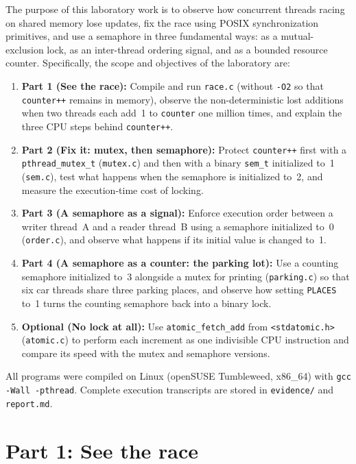 \documentclass{../latex/utmreport}
\providecommand{\tightlist}{\setlength{\itemsep}{0pt}\setlength{\parskip}{0pt}}
\begin{document}
The purpose of this laboratory work is to observe how concurrent threads racing on shared memory lose updates, fix the race using POSIX synchronization primitives, and use a semaphore in three fundamental ways: as a mutual-exclusion lock, as an inter-thread ordering signal, and as a bounded resource counter. Specifically, the scope and objectives of the laboratory are:
\begin{enumerate}
\tightlist
\item \textbf{Part 1 (See the race):} Compile and run \texttt{race.c} (without \texttt{-O2} so that \texttt{counter++} remains in memory), observe the non-deterministic lost additions when two threads each add~1 to \texttt{counter} one million times, and explain the three CPU steps behind \texttt{counter++}.
\item \textbf{Part 2 (Fix it: mutex, then semaphore):} Protect \texttt{counter++} first with a \texttt{pthread\_mutex\_t} (\texttt{mutex.c}) and then with a binary \texttt{sem\_t} initialized to~1 (\texttt{sem.c}), test what happens when the semaphore is initialized to~2, and measure the execution-time cost of locking.
\item \textbf{Part 3 (A semaphore as a signal):} Enforce execution order between a writer thread~A and a reader thread~B using a semaphore initialized to~0 (\texttt{order.c}), and observe what happens if its initial value is changed to~1.
\item \textbf{Part 4 (A semaphore as a counter: the parking lot):} Use a counting semaphore initialized to~3 alongside a mutex for printing (\texttt{parking.c}) so that six car threads share three parking places, and observe how setting \texttt{PLACES} to~1 turns the counting semaphore back into a binary lock.
\item \textbf{Optional (No lock at all):} Use \texttt{atomic\_fetch\_add} from \texttt{<stdatomic.h>} (\texttt{atomic.c}) to perform each increment as one indivisible CPU instruction and compare its speed with the mutex and semaphore versions.
\end{enumerate}

All programs were compiled on Linux (openSUSE Tumbleweed, x86\_64) with \texttt{gcc -Wall -pthread}. Complete execution transcripts are stored in \texttt{evidence/} and \texttt{report.md}.

\chapter{Part 1: See the race}
\end{document}
